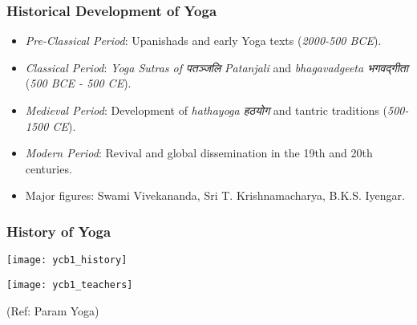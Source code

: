 \begin{frame}[fragile]\frametitle{Historical Development of Yoga}

      \begin{itemize}
		\item \textit{Pre-Classical Period}: Upanishads and early Yoga texts (\textit{2000-500 BCE}).
		\item \textit{Classical Period}: \textit{Yoga Sutras of  पतञ्जलि  Patanjali} and \textit{bhagavadgeeta भगवद्गीता } (\textit{500 BCE - 500 CE}).
		\item \textit{Medieval Period}: Development of \textit{hathayoga हठयोग } and tantric traditions (\textit{500-1500 CE}).
		\item \textit{Modern Period}: Revival and global dissemination in the 19th and 20th centuries.
		\item Major figures: Swami Vivekananda, Sri T. Krishnamacharya, B.K.S. Iyengar.
		
	  \end{itemize}

\end{frame}

\begin{frame}[fragile]\frametitle{History of Yoga}
      \begin{center}
        \texttt{[image: ycb1\_history]}

        \texttt{[image: ycb1\_teachers]}

		{\tiny (Ref: Param Yoga)}		
        \end{center}

\end{frame}


